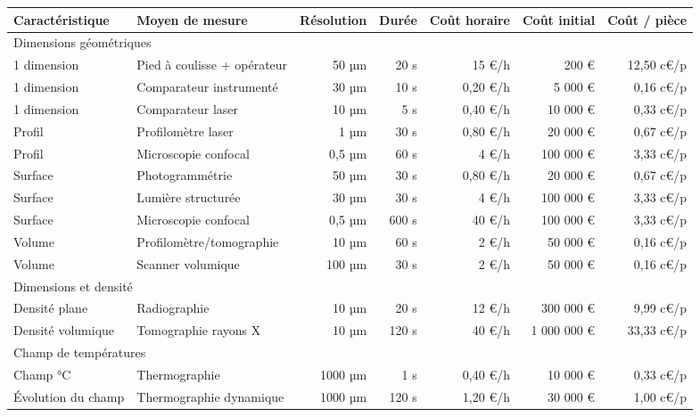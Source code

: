 \begin{table}[htpb]
	\hspace*{-1,5cm}
	\begin{tabular}{|l|l|r|r|r|r|r|}
		\arrayrulecolor{black}
		\hline
		Caractéristique & Moyen de mesure & Résolution & Durée & Coût horaire & Coût initial & Coût / pièce \\ \hline
		\hline
		\multicolumn{7}{|l|}{Dimensions géométriques} \\ \hline
		1 dimension & Pied à coulisse + opérateur & 50 µm & 20 s & 15 €/h & 200 € & 12,50 c€/p \\ \hline
		1 dimension & Comparateur instrumenté & 30 µm & 10 s & 0,20 €/h & 5 000 € & 0,16 c€/p \\ \hline
		1 dimension & Comparateur laser & 10 µm & 5 s & 0,40 €/h & 10 000 € & 0,33 c€/p \\ \hline
		\hline
		Profil & Profilomètre laser & 1 µm & 30 s & 0,80 €/h & 20 000 € & 0,67 c€/p \\ \hline
		Profil & Microscopie confocal & 0,5 µm & 60 s & 4 €/h & 100 000 € & 3,33 c€/p \\ \hline
		\hline
		Surface & Photogrammétrie & 50 µm & 30 s & 0,80 €/h & 20 000 € & 0,67 c€/p \\ \hline
		Surface & Lumière structurée & 30 µm & 30 s & 4 €/h & 100 000 € & 3,33 c€/p \\ \hline  %
		Surface & Microscopie confocal & 0,5 µm & 600 s & 40 €/h & 100 000 € & 3,33 c€/p \\ \hline
		\hline
		Volume & Profilomètre/tomographie & 10 µm & 60 s & 2 €/h & 50 000 € & 0,16 c€/p \\ \hline
		Volume & Scanner volumique & 100 µm & 30 s & 2 €/h & 50 000 € & 0,16 c€/p \\ \hline
		\hline
		\multicolumn{7}{|l|}{Dimensions et densité} \\ \hline
		Densité plane & Radiographie & 10 µm & 20 s & 12 €/h & 300 000 € & 9,99 c€/p \\ \hline
		Densité volumique & Tomographie rayons X & 10 µm & 120 s & 40 €/h & 1 000 000 € & 33,33 c€/p \\ \hline
		\hline
		\multicolumn{7}{|l|}{Champ de températures} \\ \hline
		Champ °C & Thermographie & 1000 µm & 1 s & 0,40 €/h & 10 000 € & 0,33 c€/p \\ \hline
		Évolution du champ & Thermographie dynamique & 1000 µm & 120 s & 1,20 €/h & 30 000 € & 1,00 c€/p \\ \hline

\end{tabular}
\end{table}
